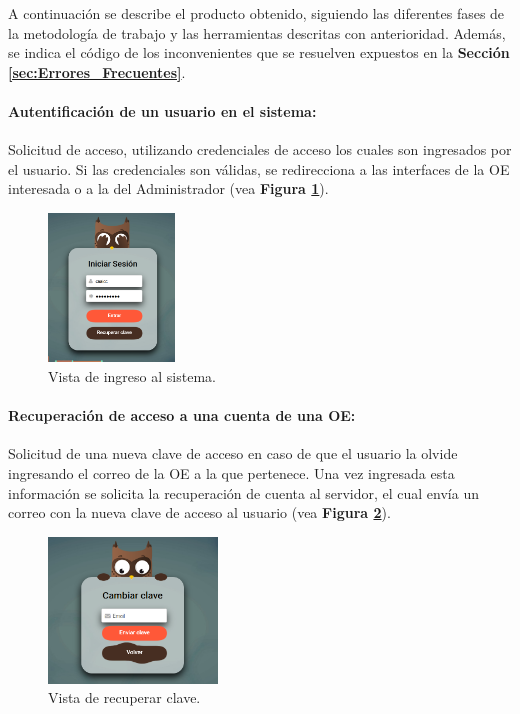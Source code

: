 A continuación se describe el producto obtenido, siguiendo las diferentes fases de la metodología de trabajo y las herramientas descritas con anterioridad. Además, se indica el código de los inconvenientes que se resuelven expuestos en la \textbf{Sección \ref{sec:Errores_Frecuentes}}.

\paragraph{Autentificación de un usuario en el sistema: } Solicitud de acceso, utilizando credenciales de acceso los cuales son ingresados por el usuario. Si las credenciales son válidas, se redirecciona a las interfaces de la OE interesada o a la del Administrador (vea \textbf{Figura \ref{fig: Login}}).

\begin{figure}[h]
    \centering
    \includegraphics[width=0.3\textwidth]{Imagenes/Login.PNG}
    \caption{\label{fig: Login}Vista de ingreso al sistema.}
\end{figure}

\paragraph{Recuperación de acceso a una cuenta de una OE: } Solicitud de una nueva clave de acceso en caso de que el usuario la olvide ingresando el correo de la OE a la que pertenece. Una vez ingresada esta información se solicita la recuperación de cuenta al servidor, el cual envía un correo con la nueva clave de acceso al usuario (vea \textbf{Figura \ref{fig: RecuperarClave}}).

\begin{figure}[h]
    \centering
    \includegraphics[width=0.4\textwidth]{Imagenes/RecuperarClave.PNG}
    \caption{\label{fig: RecuperarClave}Vista de recuperar clave.}
\end{figure}

